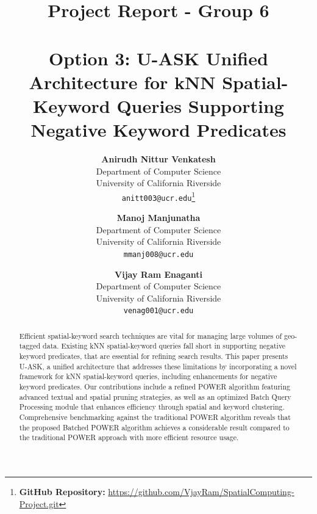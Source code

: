 \documentclass[conference]{IEEEtran}
\begin{document}
\title{
\textbf{Project Report - Group 6}\\
\textbf{\\Option 3: U-ASK Unified Architecture for kNN Spatial-Keyword Queries Supporting Negative Keyword Predicates}
\textbf{}}

\author{%
  \textbf{Anirudh Nittur Venkatesh}\\
  \small Department of Computer Science\\
  \small University of California Riverside\\
  \small \texttt{anitt003@ucr.edu}\thanks{\textbf{GitHub Repository:} \href{https://github.com/VjayRam/SpatialComputing-Project.git}{https://github.com/VjayRam/SpatialComputing-Project.git}}
  \and
  \textbf{Manoj Manjunatha}\\
  \small Department of Computer Science\\
  \small University of California Riverside\\
  \small \texttt{mmanj008@ucr.edu}
  \and
  \textbf{Vijay Ram Enaganti}\\
  \small Department of Computer Science\\
  \small University of California Riverside\\
  \small \texttt{venag001@ucr.edu}
}

\maketitle


\begin{abstract}
Efficient spatial-keyword search techniques are vital for managing large volumes of geo-tagged data. Existing kNN spatial-keyword queries fall short in supporting negative keyword predicates, that are essential for refining search results. This paper presents U-ASK, a unified architecture that addresses these limitations by incorporating a novel framework for kNN spatial-keyword queries, including enhancements for negative keyword predicates. Our contributions include a refined POWER algorithm featuring advanced textual and spatial pruning strategies, as well as an optimized Batch Query Processing module that enhances efficiency through spatial and keyword clustering. Comprehensive benchmarking against the traditional POWER algorithm reveals that the proposed Batched POWER algorithm achieves a considerable result compared to the traditional POWER approach with more efficient resource usage.\\
\end{abstract}
\end{document}
